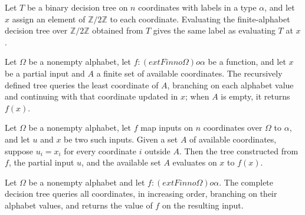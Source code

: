 \begin{theorem}
\leanok
{}
Let $T$ be a binary decision tree on $n$ coordinates with labels in a type $\alpha$, and
let $x$ assign an element of $\mathbb{Z}/2\mathbb{Z}$ to each coordinate. Evaluating the
finite-alphabet decision tree over $\mathbb{Z}/2\mathbb{Z}$ obtained from $T$ gives the
same label as evaluating $T$ at $x$.
\end{theorem}

\begin{definition}
\label{FABL.FiniteDecisionTree.completeTreeAux}
\leanok
{}
Let $\Omega$ be a nonempty alphabet, let $f:(	ext{Fin }n	o\Omega)	o\alpha$ be a function, and let
$x$ be a partial input and $A$ a finite set of available coordinates. The recursively
defined tree queries the least coordinate of $A$, branching on each alphabet value and
continuing with that coordinate updated in $x$; when $A$ is empty, it returns $f(x)$.
\end{definition}

\begin{theorem}
\label{FABL.FiniteDecisionTree.eval_completeTreeAux}
\leanok
{}
Let $\Omega$ be a nonempty alphabet, let $f$ map inputs on $n$ coordinates over $\Omega$
to $\alpha$, and let $u$ and $x$ be two such inputs. Given a set $A$ of available
coordinates, suppose $u_i=x_i$ for every coordinate $i$ outside $A$. Then the tree
constructed from $f$, the partial input $u$, and the available set $A$ evaluates on $x$
to $f(x)$.
\end{theorem}

\begin{definition}
\label{FABL.FiniteDecisionTree.completeTree}
\leanok
{}
Let $\Omega$ be a nonempty alphabet and let $f:(	ext{Fin }n	o\Omega)	o\alpha$. The complete
decision tree queries all coordinates, in increasing order, branching on their alphabet
values, and returns the value of $f$ on the resulting input.
\end{definition}

